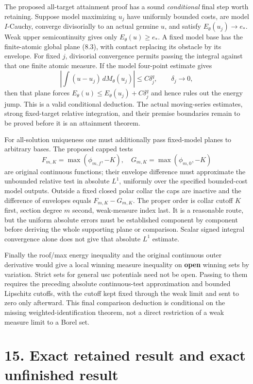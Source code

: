 \documentclass[
  10pt,
]{article}
\begin{document}
The proposed all-target attainment proof has a sound \emph{conditional}
final step worth retaining. Suppose model maximizing \(u_j\) have
uniformly bounded costs, are model \(I\)-Cauchy, converge divisorially
to an actual genuine \(u\), and satisfy \(E_\theta(u_j)\to e_*\). Weak
upper semicontinuity gives only \(E_\theta(u)\geq e_*\). A fixed model
base has the finite-atomic global plane (8.3), with contact replacing
its obstacle by its envelope. For fixed \(j\), divisorial convergence
permits passing the integral against that one finite atomic measure. If
the model four-point estimate gives
\[\left|\int(u-u_j)\,dM_\theta(u_j)\right|\leq C\delta_j^q,\qquad\delta_j\to0,\]
then that plane forces \(E_\theta(u)\leq E_\theta(u_j)+C\delta_j^q\) and
hence rules out the energy jump. This is a valid conditional deduction.
The actual moving-series estimates, strong fixed-target relative
integration, and their premise boundaries remain to be proved before it
is an attainment theorem.

For all-solution uniqueness one must additionally pass fixed-model
planes to arbitrary bases. The proposed capped tests
\[F_{m,K}=\max(\phi_{m,f},-K),\quad
G_{m,K}=\max(\phi_{m,0},-K)\] are original continuous functions; their
envelope difference must approximate the unbounded relative test in
absolute \(L^1\), uniformly over the specified bounded-cost model
outputs. Outside a fixed closed polar collar the caps are inactive and
the difference of envelopes equals \(F_{m,K}-G_{m,K}\). The proper order
is collar cutoff \(K\) first, section degree \(m\) second, weak-measure
index last. It is a reasonable route, but the uniform absolute errors
must be established component by component before deriving the whole
supporting plane or comparison. Scalar signed integral convergence alone
does not give that absolute \(L^1\) estimate.

Finally the roof/max energy inequality and the original continuous outer
derivative would give a local winning measure inequality on
\textbf{open} winning sets by variation. Strict sets for general usc
potentials need not be open. Passing to them requires the preceding
absolute continuous-test approximation and bounded Lipschitz cutoffs,
with the cutoff kept fixed through the weak limit and sent to zero only
afterward. This final comparison deduction is conditional on the missing
weighted-identification theorem, not a direct restriction of a weak
measure limit to a Borel set.

\section{15. Exact retained result and exact unfinished
result}\label{exact-retained-result-and-exact-unfinished-result}
\end{document}
